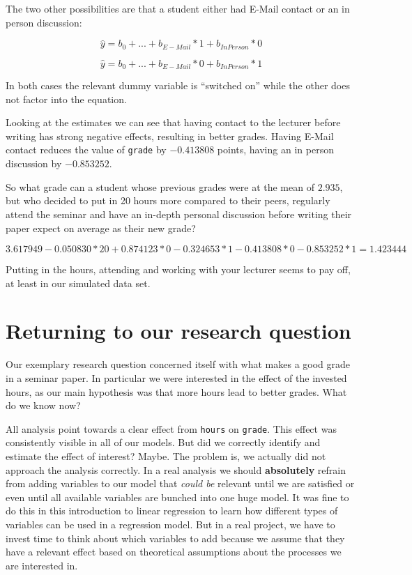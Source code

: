 \documentclass[
]{book}
\begin{document}
The two other possibilities are that a student either had E-Mail contact or an
in person discussion:

\[\hat{y} = b_0 + ... + b_{E-Mail} * 1 + b_{In Person} * 0\]

\[\hat{y} = b_0 + ... + b_{E-Mail} * 0 + b_{In Person} * 1\]

In both cases the relevant dummy variable is ``switched on'' while the other does
not factor into the equation.

Looking at the estimates we can see that having contact to the lecturer before
writing has strong negative effects, resulting in better grades. Having E-Mail
contact reduces the value of \texttt{grade} by \(-0.413808\) points, having an in person
discussion by \(-0.853252\).

So what grade can a student whose previous grades were at the mean of \(2.935\),
but who decided to put in 20 hours more compared to their peers, regularly
attend the seminar and have an in-depth personal discussion before writing their
paper expect on average as their new grade?

\[3.617949 - 0.050830 * 20 + 0.874123 * 0 - 0.324653 * 1 - 0.413808 * 0 - 0.853252 * 1 = 1.423444\]

Putting in the hours, attending and working with your lecturer seems to pay off,
at least in our simulated data set.

\hypertarget{returning-to-our-research-question}{%
\section{Returning to our research question}\label{returning-to-our-research-question}}

Our exemplary research question concerned itself with what makes a good grade in
a seminar paper. In particular we were interested in the effect of the invested
hours, as our main hypothesis was that more hours lead to better grades. What do
we know now?

All analysis point towards a clear effect from \texttt{hours} on \texttt{grade}. This effect
was consistently visible in all of our models. But did we correctly identify
and estimate the effect of interest? Maybe. The problem is, we actually did not
approach the analysis correctly. In a real analysis we should \textbf{absolutely}
refrain from adding variables to our model that \emph{could be} relevant until we are
satisfied or even until all available variables are bunched into one huge model.
It was fine to do this in this introduction to linear regression to learn how
different types of variables can be used in a regression model. But in a real
project, we have to invest time to think about which variables to add because we
assume that they have a relevant effect based on theoretical assumptions about
the processes we are interested in.
\end{document}
